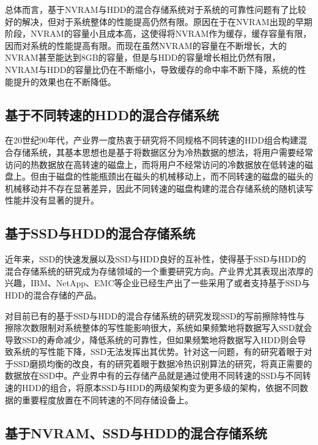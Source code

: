 总体而言，基于NVRAM与HDD的混合存储系统对于系统的可靠性问题有了比较好的解决，但对于系统整体的性能提高仍然有限。原因在于在NVRAM出现的早期阶段，NVRAM的容量小且成本高，这使得将NVRAM作为缓存，缓存容量有限，因而对系统的性能提高有限。而现在虽然NVRAM的容量在不断增长，大的NVRAM甚至能达到8GB的容量，但是与HDD的容量增长相比仍然有限，NVRAM与HDD的容量比仍在不断缩小，导致缓存的命中率不断下降，系统的性能提升的效果也在不断降低。

\subsection{基于不同转速的HDD的混合存储系统}

在20世纪90年代，产业界一度热衷于研究将不同规格不同转速的HDD组合构建混合存储系统，其基本思想也是基于将数据区分为冷热数据的想法，将用户需要经常访问的热数据放在高转速的磁盘上，而将用户不经常访问的冷数据放在低转速的磁盘上。但由于磁盘的性能瓶颈出在磁头的机械移动上，而不同转速的磁盘的磁头的机械移动并不存在显著差异，因此不同转速的磁盘构建的混合存储系统的随机读写性能并没有显著的提升。

\subsection{基于SSD与HDD的混合存储系统}

近年来，SSD的快速发展以及SSD与HDD良好的互补性，使得基于SSD与HDD的混合存储系统的研究成为存储领域的一个重要研究方向。产业界尤其表现出浓厚的兴趣，IBM\cite{ibm2010ds8000}、NetApp\cite{netapp}、EMC\cite{laliberte2009automate}等企业已经生产出了一些采用了或者支持基于SSD与HDD的混合存储的产品。

对目前已有的基于SSD与HDD的混合存储系统的研究发现SSD的写前擦除特性与擦除次数限制对系统整体的写性能影响很大，系统如果频繁地将数据写入SSD就会导致SSD的寿命减少，降低系统的可靠性，但如果频繁地将数据写入HDD则会导致系统的写性能下降，SSD无法发挥出其优势。针对这一问题，有的研究着眼于对于SSD磨损均衡的改良\cite{王增辉2015磨损均衡在提高, 李恒恒2016基于, 陈晓敏2010基于}，有的研究着眼于数据冷热识别算法的研究\cite{刘庆宾2016面向多用户的, 闫林2014基于}，将真正需要的数据放在SSD中。产业界中有的云存储产品就是通过使用不同转速的SSD与不同转速的HDD的组合，将原本SSD与HDD的两级架构变为更多级的架构，依据不同数据的重要程度放置在不同转速的不同存储设备上。

\subsection{基于NVRAM、SSD与HDD的混合存储系统}

